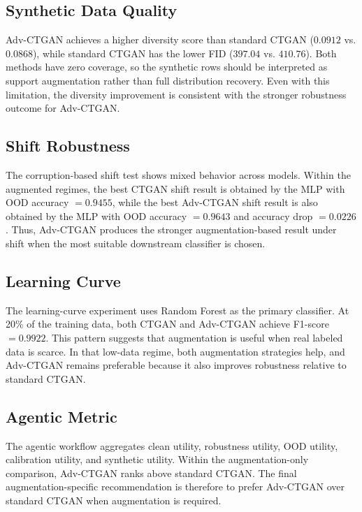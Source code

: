 \documentclass[conference]{IEEEtran}
\begin{document}
\subsection{Synthetic Data Quality}

Adv-CTGAN achieves a higher diversity score than standard CTGAN ($0.0912$ vs. $0.0868$), while standard CTGAN has the lower FID ($397.04$ vs. $410.76$). Both methods have zero coverage, so the synthetic rows should be interpreted as support augmentation rather than full distribution recovery. Even with this limitation, the diversity improvement is consistent with the stronger robustness outcome for Adv-CTGAN.

\subsection{Shift Robustness}

The corruption-based shift test shows mixed behavior across models. Within the augmented regimes, the best CTGAN shift result is obtained by the MLP with OOD accuracy $= 0.9455$, while the best Adv-CTGAN shift result is also obtained by the MLP with OOD accuracy $= 0.9643$ and accuracy drop $= 0.0226$. Thus, Adv-CTGAN produces the stronger augmentation-based result under shift when the most suitable downstream classifier is chosen.

\subsection{Learning Curve}

The learning-curve experiment uses Random Forest as the primary classifier. At 20\% of the training data, both CTGAN and Adv-CTGAN achieve F1-score $= 0.9922$. This pattern suggests that augmentation is useful when real labeled data is scarce. In that low-data regime, both augmentation strategies help, and Adv-CTGAN remains preferable because it also improves robustness relative to standard CTGAN.

\subsection{Agentic Metric}

The agentic workflow aggregates clean utility, robustness utility, OOD utility, calibration utility, and synthetic utility. Within the augmentation-only comparison, Adv-CTGAN ranks above standard CTGAN. The final augmentation-specific recommendation is therefore to prefer Adv-CTGAN over standard CTGAN when augmentation is required.
\end{document}
